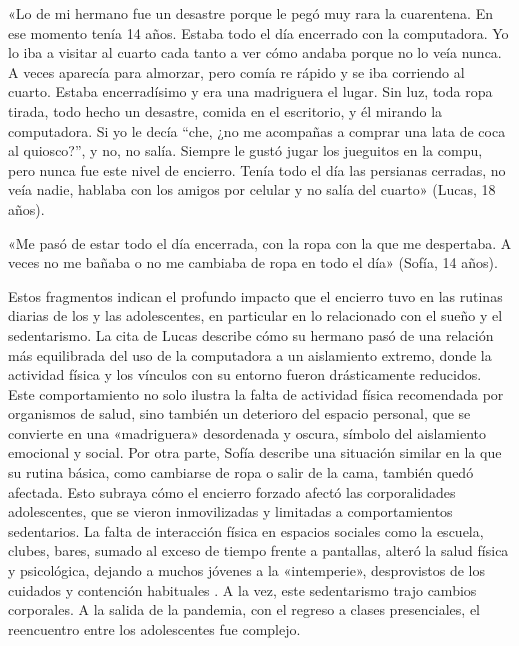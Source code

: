 \begin{refsection}
\begin{gbcita}
«Lo de mi hermano fue un desastre porque le pegó muy rara la cuarentena. En ese momento tenía 14 años. Estaba todo el día encerrado con la computadora. Yo lo iba a visitar al cuarto cada tanto a ver cómo andaba porque no lo veía nunca. A veces aparecía para almorzar, pero comía re rápido y se iba corriendo al cuarto. Estaba encerradísimo y era una madriguera el lugar. Sin luz, toda ropa tirada, todo hecho un desastre, comida en el escritorio, y él mirando la computadora. Si yo le decía “che, ¿no me acompañas a comprar una lata de coca al quiosco?”, y no, no salía. Siempre le gustó jugar los jueguitos en la compu, pero nunca fue este nivel de encierro. Tenía todo el día las persianas cerradas, no veía nadie, hablaba con los amigos por celular y no salía del cuarto» (Lucas, 18 años).

«Me pasó de estar todo el día encerrada, con la ropa con la que me despertaba. A veces no me bañaba o no me cambiaba de ropa en todo el día» (Sofía, 14 años).

\end{gbcita}

Estos fragmentos indican el profundo impacto que el encierro tuvo en las rutinas diarias de los y las adolescentes, en particular en lo relacionado con el sueño y el sedentarismo. La cita de Lucas describe cómo su hermano pasó de una relación más equilibrada del uso de la computadora a un aislamiento extremo, donde la actividad física y los vínculos con su entorno fueron drásticamente reducidos. Este comportamiento no solo ilustra la falta de actividad física recomendada por organismos de salud, sino también un deterioro del espacio personal, que se convierte en una «madriguera» desordenada y oscura, símbolo del aislamiento emocional y social. Por otra parte, Sofía describe una situación similar en la que su rutina básica, como cambiarse de ropa o salir de la cama, también quedó afectada. Esto subraya cómo el encierro forzado afectó las corporalidades adolescentes, que se vieron inmovilizadas y limitadas a comportamientos sedentarios. La falta de interacción física en espacios sociales como la escuela, clubes, bares, sumado al exceso de tiempo frente a pantallas, alteró la salud física y psicológica, dejando a muchos jóvenes a la «intemperie», desprovistos de los cuidados y contención habituales \protect\parencite{4230-SIMONI2022}. A la vez, este sedentarismo trajo cambios corporales. A la salida de la pandemia, con el regreso a clases presenciales, el reencuentro entre los adolescentes fue complejo.



\end{refsection}
